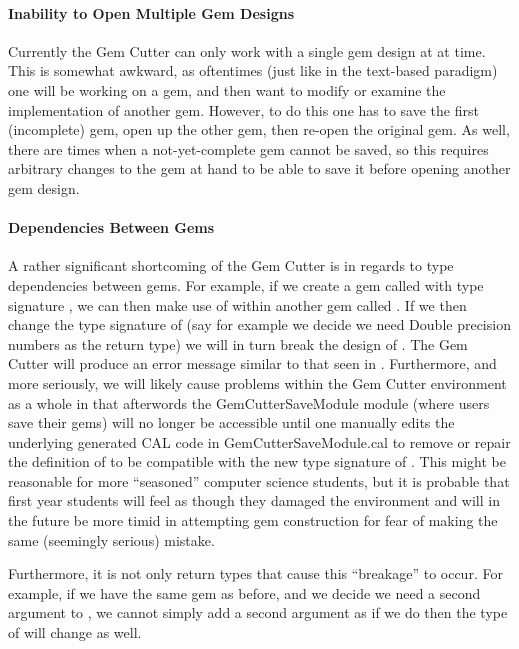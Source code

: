 \paragraph{Inability to Open Multiple Gem Designs}

Currently the Gem Cutter can only work with a single gem design at at time.  This is somewhat awkward, as oftentimes (just like in the text-based paradigm) one will be working on a gem, and then want to modify or examine the implementation of another gem.  However, to do this one has to save the first (incomplete) gem, open up the other gem, then re-open the original gem.  As well, there are times when a not-yet-complete gem cannot be saved, so this requires arbitrary changes to the gem at hand to be able to save it before opening another gem design.

\paragraph{Dependencies Between Gems}
\label{para:Gemdependencies}

A rather significant shortcoming of the Gem Cutter is in regards to type dependencies between gems.  For example, if we create a gem called  with type signature , we can then make use of  within another gem called .  If we then change the type signature of  (say for example we decide we need Double precision numbers as the return type) we will in turn break the design of .  The Gem Cutter will produce an error message similar to that seen in .  Furthermore, and more seriously, we will likely cause problems within the Gem Cutter environment as a whole in that afterwords the GemCutterSaveModule module (where users save their gems) will no longer be accessible until one manually edits the underlying generated CAL code in GemCutterSaveModule.cal to remove or repair the definition of  to be compatible with the new type signature of .  This might be reasonable for more ``seasoned'' computer science students, but it is probable that first year students will feel as though they damaged the environment and will in the future be more timid in attempting gem construction for fear of making the same (seemingly serious) mistake.


Furthermore, it is not only return types that cause this ``breakage'' to occur.  For example, if we have the same  gem as before, and we decide we need a second argument to , we cannot simply add a second argument as if we do then the type of  will change as well.

